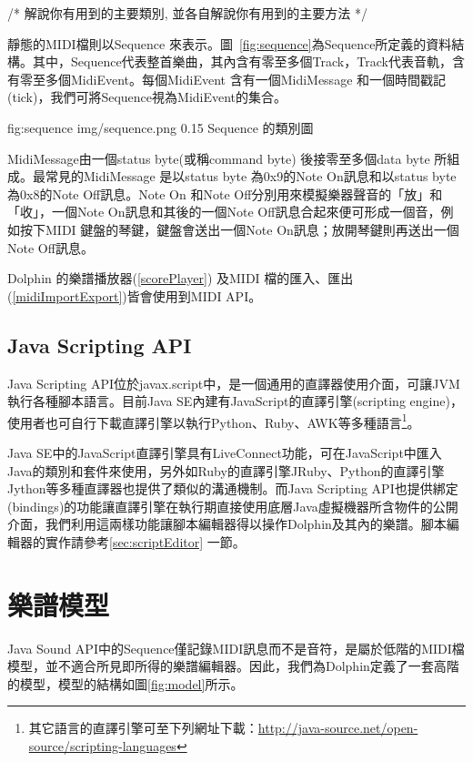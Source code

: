 \documentclass[12pt,a4paper,oneside]{report}
\begin{document}
/*
     解說你有用到的主要類別, 並各自解說你有用到的主要方法
*/




靜態的MIDI檔則以Sequence 來表示。圖~\ref{fig:sequence}為Sequence所定義的資料結構。其中，Sequence代表整首樂曲，其內含有零至多個Track，Track代表音軌，含有零至多個MidiEvent。每個MidiEvent 含有一個MidiMessage 和一個時間戳記(tick)，我們可將Sequence視為MidiEvent的集合。

\figurewithcaption
{fig:sequence}
{img/sequence.png}
{0.15}
{Sequence 的類別圖}

MidiMessage由一個status byte(或稱command byte) 後接零至多個data byte 所組成。最常見的MidiMessage 是以status byte 為0x9的Note On訊息和以status byte 為0x8的Note Off訊息。Note On 和Note Off分別用來模擬樂器聲音的「放」和「收」，一個Note On訊息和其後的一個Note Off訊息合起來便可形成一個音，例如按下MIDI 鍵盤的琴鍵，鍵盤會送出一個Note On訊息；放開琴鍵則再送出一個Note Off訊息。

Dolphin 的樂譜播放器(\ref{scorePlayer}) 及MIDI 檔的匯入、匯出(\ref{midiImportExport})皆會使用到MIDI API。

\subsection{Java Scripting API}

Java Scripting API位於javax.script中，是一個通用的直譯器使用介面，可讓JVM 執行各種腳本語言。目前Java SE內建有JavaScript的直譯引擎(scripting engine)，使用者也可自行下載直譯引擎以執行Python、Ruby、AWK等多種語言\footnote{其它語言的直譯引擎可至下列網址下載：\url{http://java-source.net/open-source/scripting-languages}}。

Java SE中的JavaScript直譯引擎具有LiveConnect功能，可在JavaScript中匯入Java的類別和套件來使用，另外如Ruby的直譯引擎JRuby、Python的直譯引擎Jython等多種直譯器也提供了類似的溝通機制。而Java Scripting API也提供綁定(bindings)的功能讓直譯引擎在執行期直接使用底層Java虛擬機器所含物件的公開介面，我們利用這兩樣功能讓腳本編輯器得以操作Dolphin及其內的樂譜。腳本編輯器的實作請參考\ref{sec:scriptEditor} 一節。

\section{樂譜模型}

Java Sound API中的Sequence僅記錄MIDI訊息而不是音符，是屬於低階的MIDI檔模型，並不適合所見即所得的樂譜編輯器。因此，我們為Dolphin定義了一套高階的模型，模型的結構如圖\ref{fig:model}所示。
\end{document}
